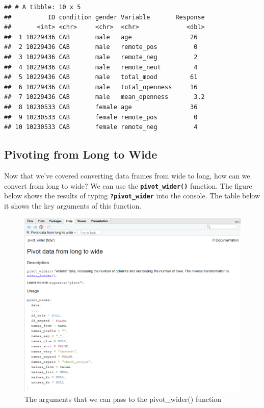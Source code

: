 \documentclass[
]{book}
\begin{document}
\begin{verbatim}
## # A tibble: 10 x 5
##          ID condition gender Variable       Response
##       <int> <chr>     <chr>  <chr>             <dbl>
##  1 10229436 CAB       male   age                26  
##  2 10229436 CAB       male   remote_pos          0  
##  3 10229436 CAB       male   remote_neg          2  
##  4 10229436 CAB       male   remote_neut         4  
##  5 10229436 CAB       male   total_mood         61  
##  6 10229436 CAB       male   total_openness     16  
##  7 10229436 CAB       male   mean_openness       3.2
##  8 10230533 CAB       female age                36  
##  9 10230533 CAB       female remote_pos          0  
## 10 10230533 CAB       female remote_neg          4
\end{verbatim}

\hypertarget{pivoting-from-long-to-wide}{%
\subsection{Pivoting from Long to Wide}\label{pivoting-from-long-to-wide}}

Now that we've covered converting data frames from wide to long, how can we convert from long to wide? We can use the \textbf{\texttt{pivot\_wider()}} function. The figure below shows the results of typing \textbf{\texttt{?pivot\_wider}} into the console. The table below it shows the key arguments of this function.

\begin{figure}
\centering
\includegraphics{img/06-pivotwider.png}
\caption{\label{fig:unnamed-chunk-236}The arguments that we can pass to the pivot\_wider() function}
\end{figure}
\end{document}
